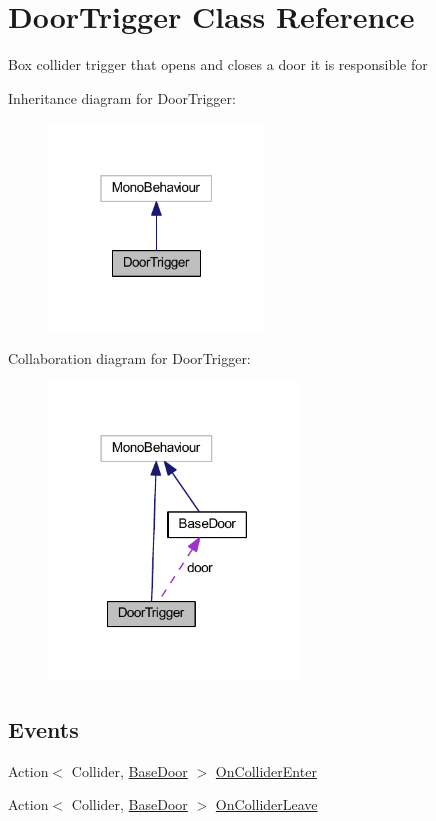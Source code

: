 \hypertarget{class_door_trigger}{}\section{Door\+Trigger Class Reference}
\label{class_door_trigger}


Box collider trigger that opens and closes a door it is responsible for  




Inheritance diagram for Door\+Trigger\+:
\nopagebreak
\begin{figure}[H]
\begin{center}
\leavevmode
\includegraphics[width=163pt]{class_door_trigger__inherit__graph}
\end{center}
\end{figure}


Collaboration diagram for Door\+Trigger\+:
\nopagebreak
\begin{figure}[H]
\begin{center}
\leavevmode
\includegraphics[width=189pt]{class_door_trigger__coll__graph}
\end{center}
\end{figure}
\subsection*{Events}
\begin{DoxyCompactItemize}
\item 
Action$<$ Collider, \mbox{\hyperlink{class_base_door}{Base\+Door}} $>$ \mbox{\hyperlink{class_door_trigger_aaf26dd7fb0f0ce643f5fd50805e2b4e0}{On\+Collider\+Enter}}
\item 
Action$<$ Collider, \mbox{\hyperlink{class_base_door}{Base\+Door}} $>$ \mbox{\hyperlink{class_door_trigger_af00f29ad47c5853b9f8ff03048223e30}{On\+Collider\+Leave}}
\end{DoxyCompactItemize}
